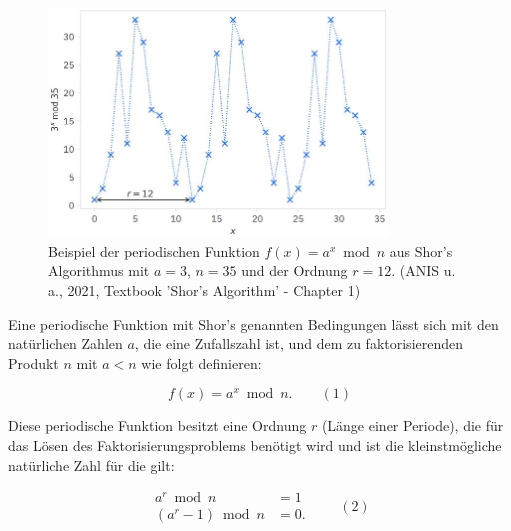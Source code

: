 	\begin{figure}
        \centering
        \includegraphics[width=9cm]{content/periodicExample.JPG}
        \caption{Beispiel der periodischen Funktion \(f(x) = a^x\bmod{n}\) aus Shor's Algorithmus mit \(a=3\), \(n=35\) und der Ordnung \(r=12\). (ANIS u. a., 2021, Textbook ’Shor’s
        Algorithm’ - Chapter 1)}
        \label{fig:periodicExample}
    \end{figure}

	\newline
	\newline \newline

	Eine periodische Funktion mit Shor's genannten Bedingungen lässt sich mit den natürlichen Zahlen \(a\), die eine Zufallszahl ist, und dem zu faktorisierenden Produkt \(n\) mit \(a < n\) wie folgt definieren:

	\begin{equation}
	    f(x) = a^x\bmod{n}.
		\quad \quad (1)
	\end{equation}

	\newline

    Diese periodische Funktion besitzt eine Ordnung \(r\) (Länge einer Periode), die für das Lösen des Faktorisierungsproblems benötigt wird und ist die kleinstmögliche natürliche Zahl für die gilt:

	\begin{equation}\begin{aligned}\label{eq:17}
	    a^r\bmod{n} &= 1 \\
	    (a^r-1)\bmod{n} &= 0.
	    \end{aligned}
    \quad \quad (2)
	\end{equation}


